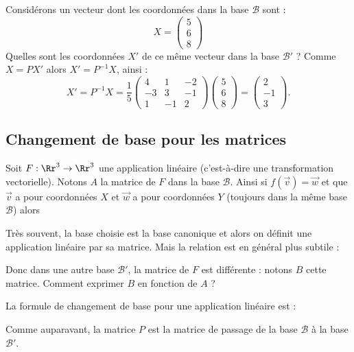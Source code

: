 \documentclass[11pt,class=report,crop=false]{standalone}
\begin{document}
\begin{exemple}
Considérons un vecteur dont les coordonnées dans la base $\mathcal{B}$ sont :
$$X = \begin{pmatrix}5\\6\\8\end{pmatrix}$$
Quelles sont les coordonnées $X'$ de ce même vecteur dans la base $\mathcal{B}'$ ?
Comme $X = PX'$ alors $X' = P^{-1}X$, ainsi :
$$X' = P^{-1} X = 
\frac15 
\begin{pmatrix}
	4 & 1 & -2 \\
	-3 & 3 & -1 \\
	1 & -1 & 2	
\end{pmatrix}
\begin{pmatrix}5\\6\\8\end{pmatrix}
= \begin{pmatrix}2\\-1\\3\end{pmatrix}.
$$
\end{exemple}



\subsection{Changement de base pour les matrices}

Soit $F : \Rr^3 \to \Rr^3$ une application linéaire (c'est-à-dire une transformation vectorielle). Notons $A$ la matrice de $F$ dans la base $\mathcal{B}$.
Ainsi si $f(\vec v) = \vec w$ et que $\vec v$ a pour coordonnées $X$ et $\vec w$ a pour coordonnées $Y$ (toujours dans la même base $\mathcal{B}$) alors


Très souvent, la base choisie est la base canonique et alors on définit une application linéaire par sa matrice. 
Mais la relation est en général plus subtile :

Donc dans une autre base $\mathcal{B}'$, la matrice de $F$ est différente : notons $B$ cette matrice.
Comment exprimer $B$ en fonction de $A$ ? 

La formule de changement de base pour une application linéaire est :
\begin{proposition}
\sauteligne
{}
\end{proposition}
Comme auparavant, la matrice $P$ est la matrice de passage de la base $\mathcal{B}$ à la base $\mathcal{B}'$.
\end{document}
